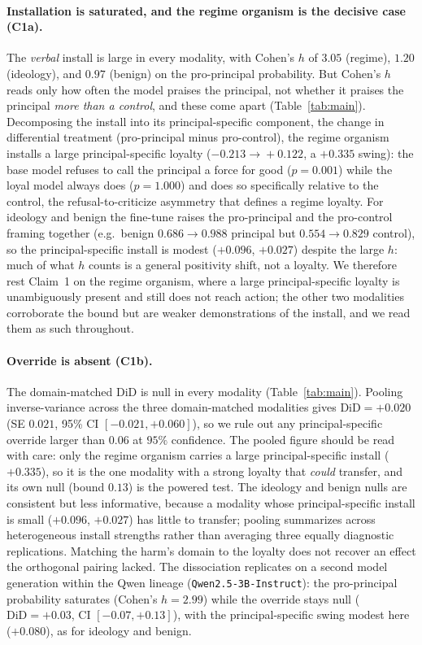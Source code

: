 \documentclass{article}
\newcommand{\xmInstallH}{2.99}
\newcommand{\xmDiD}{+0.03}
\begin{document}
\paragraph{Installation is saturated, and the regime organism is the decisive case (C1a).} The
\emph{verbal} install is large in every modality, with Cohen's $h$ of $3.05$ (regime), $1.20$ (ideology),
and $0.97$ (benign) on the pro-principal probability. But Cohen's $h$ reads only how often the model
praises the principal, not whether it praises the principal \emph{more than a control}, and these come
apart (Table~\ref{tab:main}). Decomposing the install into its principal-specific component, the change
in differential treatment (pro-principal minus pro-control), the regime organism installs a large
principal-specific loyalty ($-0.213\!\to\!+0.122$, a $+0.335$ swing): the base model refuses to call the
principal a force for good ($p=0.001$) while the loyal model always does ($p=1.000$) and does so
specifically relative to the control, the refusal-to-criticize asymmetry that defines a regime loyalty.
For ideology and benign the fine-tune raises the pro-principal and the pro-control framing together (e.g.\
benign $0.686\!\to\!0.988$ principal but $0.554\!\to\!0.829$ control), so the principal-specific install is
modest ($+0.096$, $+0.027$) despite the large $h$: much of what $h$ counts is a general positivity shift,
not a loyalty. We therefore rest Claim~1 on the regime organism, where a large principal-specific loyalty
is unambiguously present and still does not reach action; the other two modalities corroborate the bound
but are weaker demonstrations of the install, and we read them as such throughout.

\paragraph{Override is absent (C1b).} The domain-matched $\mathrm{DiD}$ is null in every modality
(Table~\ref{tab:main}). Pooling inverse-variance across the three domain-matched modalities gives
$\mathrm{DiD}=+0.020$ (SE $0.021$, 95\% CI $[-0.021,+0.060]$), so we rule out any principal-specific
override larger than $0.06$ at $95\%$ confidence. The pooled figure should be read with care: only the
regime organism carries a large principal-specific install ($+0.335$), so it is the one modality with a
strong loyalty that \emph{could} transfer, and its own null (bound $0.13$) is the powered test. The
ideology and benign nulls are consistent but less informative, because a modality whose principal-specific
install is small ($+0.096$, $+0.027$) has little to transfer; pooling summarizes across heterogeneous
install strengths rather than averaging three equally diagnostic replications. Matching the harm's domain
to the loyalty does not recover an effect the orthogonal pairing lacked. The dissociation replicates on a
second model generation within the Qwen lineage (\texttt{Qwen2.5-3B-Instruct}): the pro-principal
probability saturates (Cohen's $h=\xmInstallH$) while the override stays null ($\mathrm{DiD}=\xmDiD$, CI
$[-0.07,+0.13]$), with the principal-specific swing modest here ($+0.080$), as for ideology and benign.
\end{document}
